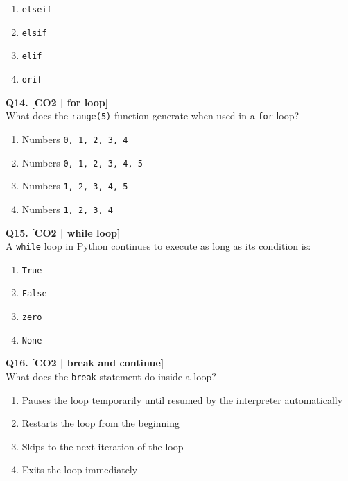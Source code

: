 \begin{enumerate}[label=(\alph*),topsep=2pt,itemsep=1pt,partopsep=0pt,parsep=0pt]
    \item \relax \texttt{elseif}
    \item \relax \texttt{elsif}
    \item \relax \texttt{elif}
    \item \relax \texttt{orif}
\end{enumerate}
\vspace{{2mm}}

\noindent\textbf{Q14.} \hfill {\small\color{LPUOrange}\textbf{[CO2 | for loop]}}\\[2pt]
What does the \texttt{range(5)} function generate when used in a \texttt{for} loop?

\begin{enumerate}[label=(\alph*),topsep=2pt,itemsep=1pt,partopsep=0pt,parsep=0pt]
    \item \relax Numbers \texttt{0, 1, 2, 3, 4}
    \item \relax Numbers \texttt{0, 1, 2, 3, 4, 5}
    \item \relax Numbers \texttt{1, 2, 3, 4, 5}
    \item \relax Numbers \texttt{1, 2, 3, 4}
\end{enumerate}
\vspace{{2mm}}

\noindent\textbf{Q15.} \hfill {\small\color{LPUOrange}\textbf{[CO2 | while loop]}}\\[2pt]
A \texttt{while} loop in Python continues to execute as long as its condition is:

\begin{enumerate}[label=(\alph*),topsep=2pt,itemsep=1pt,partopsep=0pt,parsep=0pt]
    \item \relax \texttt{True}
    \item \relax \texttt{False}
    \item \relax \texttt{zero}
    \item \relax \texttt{None}
\end{enumerate}
\vspace{{2mm}}

\noindent\textbf{Q16.} \hfill {\small\color{LPUOrange}\textbf{[CO2 | break and continue]}}\\[2pt]
What does the \texttt{break} statement do inside a loop?

\begin{enumerate}[label=(\alph*),topsep=2pt,itemsep=1pt,partopsep=0pt,parsep=0pt]
    \item \relax Pauses the loop temporarily until resumed by the interpreter automatically
    \item \relax Restarts the loop from the beginning
    \item \relax Skips to the next iteration of the loop
    \item \relax Exits the loop immediately
\end{enumerate}
\vspace{{2mm}}

